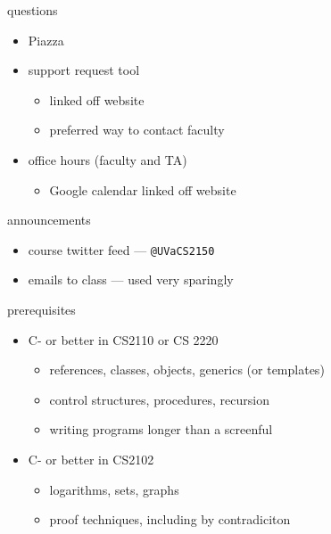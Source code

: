 \begin{frame}{questions}
    \begin{itemize}
    \item Piazza 
    \item support request tool
        \begin{itemize}
        \item linked off website
        \item preferred way to contact faculty
        \end{itemize}
    \item office hours (faculty and TA)
        \begin{itemize}
        \item Google calendar linked off website
        \end{itemize}
    \end{itemize}
\end{frame}

\begin{frame}{announcements}
    \begin{itemize}
    \item course twitter feed --- \texttt{@UVaCS2150}
    \item emails to class --- used very sparingly
    \end{itemize}
\end{frame}

\begin{frame}{prerequisites}
    \begin{itemize}
        \item C- or better in CS2110 or CS 2220
            \begin{itemize}
            \item references, classes, objects, generics (or templates)
            \item control structures, procedures, recursion
            \item writing programs longer than a screenful
            \end{itemize}
        \item C- or better in CS2102
            \begin{itemize}
            \item logarithms, sets, graphs
            \item proof techniques, including by contradiciton
            \end{itemize}
    \end{itemize}
\end{frame}

